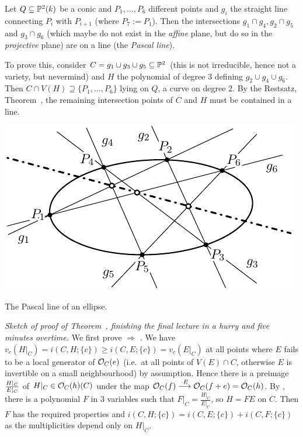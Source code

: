 \documentclass[a4paper,parskip=half,numbers=enddot, DIV=12]{scrreprt}
\begin{document}
\begin{example*}
Let $Q\subseteq \mathbb{P}^2(k)$ be a conic and $P_1,\dotsc,P_6$ different points and $g_i$ the straight line connecting
$P_i$ with $P_{i+1}$ (where $P_7 := P_1$).
Then the intersections $g_1\cap g_4, g_2\cap g_5$ and $g_3\cap g_6$ (which maybe do not exist in the \emph{affine} plane,
but do so in the \emph{projective} plane)  are on a line (the \emph{Pascal line}).

To prove this, consider $C=g_1\cup g_3\cup g_5\subseteq \mathbb{P}^2$ (this is not irreducible, hence not a variety, but nevermind)
and $H$ the polynomial of degree $3$ defining $g_2\cup g_4\cup g_6$.
Then $C\cap V(H) \supseteq \{P_1,\dotsc,P_6\}$ lying on $Q$, a curve on degree $2$.
By the Restsatz, Theorem~, the remaining intersection points of $C$ and $H$ must be contained in a line.
\begin{center}
	\includegraphics[]{Pascal.pdf}
	
	The Pascal line of an ellipse.
\end{center}
\end{example*}
\emph{Sketch of proof of Theorem~, finishing the final lecture in a hurry and five minutes overtime.}
We first prove  $\Rightarrow$ .
We have $v_c(H|_C)=i(C,H;\{c\}) \geq i(C,E;\{c\})=v_c(E|_C)$ at all points where $E$ fails to be a local generator of
$\mathcal{O}_C(e)$ (i.e.\ at all points of $V(E)\cap C$, otherwise $E$ is invertible on a small neighbourhood) by assumption. Hence there is a preimage $\frac{H|_C}{\smash{E|_C}}$
of $H\vert_C \in \mathcal{O}_C(h)(C)$ under the map $\Oo_C(f)\morphism[\cdot E] \Oo_C(f+e) = \Oo_C(h)$.
By , there is a polynomial $F$ in $3$ variables such that
$F\vert_C = \frac{H\vert_C}{E\vert_C}$, so $H=FE$ on $C$. Then $F$ has the required properties
and $i(C,H;\{c\}) = i(C,E;\{c\}) + i(C,F;\{c\})$ as the multiplicities
depend only on $H\vert_C$.
\end{document}
